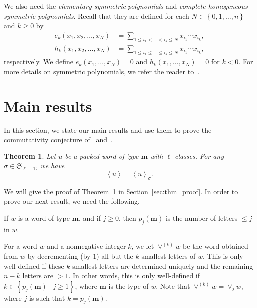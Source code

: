 \documentclass[reqno]{amsart}
\newcommand{\0}{\phantom{c}}
\newcommand{\swt}[1]{\left\langle #1 \right\rangle} %
\newcommand{\merge}[1]{\vee_{#1}} %
\newcommand{\SymGp}[1]{\mathfrak{S}_{#1}} %
\newcommand{\mm}{\mathbf{m}}
\let\sumnonlimits\sum
\renewcommand{\sum}{\sumnonlimits\limits}
\newcommand{\set}[1]{\left\{ #1 \right\}}
\newcommand{\defn}[1]{{\color{darkred}\emph{#1}}} %
\theoremstyle{plain}
\newtheorem{thm}{Theorem}[section]
\theoremstyle{definition}
\numberwithin{equation}{section}
\begin{document}
We also need the \defn{elementary symmetric polynomials} and \defn{complete homogeneous symmetric polynomials}.
Recall that they are defined for each $N \in \left\{0,1,\ldots,n\right\}$ and $k \geq 0$ by
\begin{align*}
e_k(x_1, x_2, \dotsc, x_N) & = \sum_{1 \leq i_1 < \cdots < i_k \leq N} x_{i_1} \dotsm x_{i_k},
\\ h_k(x_1, x_2, \dotsc, x_N) & = \sum_{1 \leq i_1 \leq \cdots \leq i_k \leq N} x_{i_1} \dotsm x_{i_k},
\end{align*}
respectively.
We define $e_k(x_1, \dotsc, x_N) = 0$ and $h_k(x_1, \dotsc, x_N) = 0$ for $k < 0$.
For more details on symmetric polynomials, we refer the reader to~\cite[Ch.~7]{Stanley-EC2}.








\section{Main results}
\label{sec:result}


In this section, we state our main results and use them to prove the commutativity conjecture of~\cite{AAMP} and~\cite[Conj.~3.10]{AasLin17}.

\begin{thm}
\label{thm:permutation}
  Let $u$ be a packed word of type $\mm$ with $\ell$ classes.
  For any $\sigma \in \SymGp{\ell-1}$, we have 
  \[
  \swt{u} = \swt{u}_{\sigma}.
  \]
\end{thm}

We will give the proof of Theorem~\ref{thm:permutation} in Section~\ref{sec:thm_proof}.
In order to prove our next result, we need the following.

If $w$ is a word of type $\mm$, and if $j \geq 0$, then $p_j(\mm)$ is the number of letters $\leq j$ in $w$.

For a word $w$ and a nonnegative integer $k$, we let \defn{$\vee^{(k)} w$} be the word obtained from $w$ by decrementing (by $1$) all but the $k$ smallest letters of $w$.
This is only well-defined if these $k$ smallest letters are determined uniquely and the remaining $n-k$ letters are $> 1$.
In other words, this is only well-defined if $k \in \set{ p_j(\mm) \mid j \geq 1 }$, where $\mm$ is the type of $w$.
Note that $\vee^{(k)} w = \merge{j} w$, where $j$ is such that $k = p_j(\mm)$.
\end{document}
